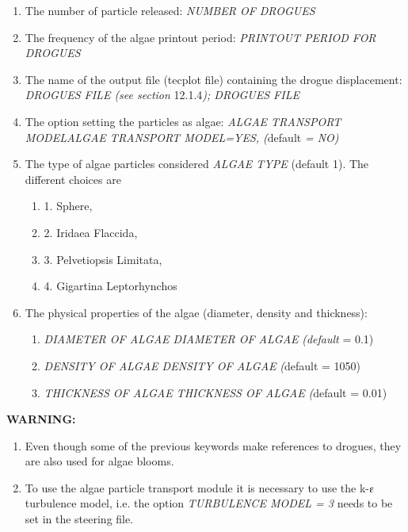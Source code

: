 \documentclass{article} %
\begin{document}
\begin{enumerate}
\item  The number of particle released: \textit{NUMBER OF DROGUES}

\item  The frequency of the algae printout period: \textit{PRINTOUT PERIOD FOR DROGUES}

\item  The name of the output file (tecplot file) containing the drogue displacement: \textit{DROGUES FILE (see section }12.1.4\textit{); DROGUES FILE} \textit{ }

\item  The option setting the particles as algae: \textit{ALGAE TRANSPORT MODELALGAE TRANSPORT MODEL=YES, (}default\textit{ = NO)}

\item  The type of algae particles considered \textit{ALGAE TYPE} (default 1). The different choices are

\begin{enumerate}
\item  1. Sphere,

\item  2. Iridaea Flaccida,

\item  3. Pelvetiopsis Limitata,

\item  4. Gigartina Leptorhynchos
\end{enumerate}

\item  The physical properties of the algae (diameter, density and thickness):

\begin{enumerate}
\item  \textit{DIAMETER OF ALGAE  DIAMETER OF ALGAE} \textit{(default }= 0.1)

\item  \textit{DENSITY OF ALGAE  DENSITY OF ALGAE} \textit{(}default = 1050)

\item  \textit{THICKNESS OF ALGAE  THICKNESS OF ALGAE} \textit{(}default = 0.01)
\end{enumerate}
\end{enumerate}

 \textbf{WARNING:}

\begin{enumerate}
\item  Even though some of the previous keywords make references to drogues, they are also used for algae blooms.

\item  To use the algae particle transport module it is necessary to use the k-$\varepsilonup$ turbulence model, i.e. the option \textit{TURBULENCE MODEL = 3} needs to be set in the steering file.
\end{enumerate}
\end{document}
